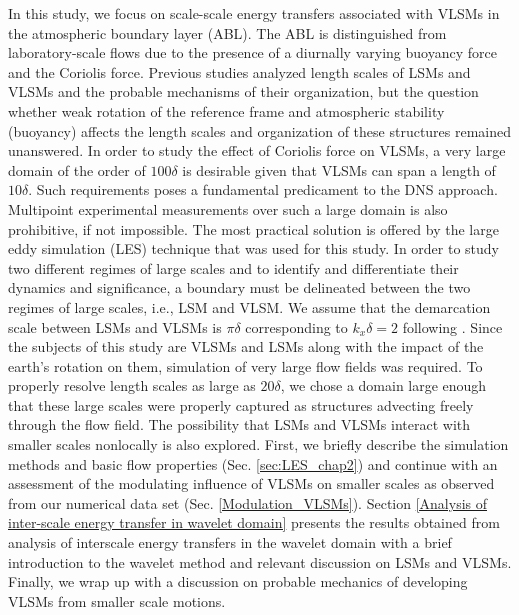 In this study, we focus on scale-scale energy transfers associated with VLSMs in the atmospheric boundary layer (ABL). The ABL is distinguished from laboratory-scale flows due to the presence of a diurnally varying buoyancy  force and the Coriolis force. Previous studies analyzed length scales of LSMs and VLSMs and the probable mechanisms of their organization, but the question whether weak rotation of the reference frame and atmospheric stability (buoyancy) affects the length scales and organization of these structures remained unanswered. In order to study the effect of Coriolis force on VLSMs, a very large domain of the order of $100\delta$ is desirable given that VLSMs can span a length of $10\delta$. Such requirements poses a fundamental predicament to the DNS approach. Multipoint experimental measurements over such a large domain is also prohibitive, if not impossible. The most practical solution is offered by the large eddy simulation (LES) technique that was used for this study. In order to study two different regimes of large scales and to identify and differentiate their dynamics and significance, a boundary must be delineated between the two regimes of large scales, i.e., LSM and VLSM. We assume that the demarcation scale between LSMs and VLSMs is $\pi\delta$ corresponding to $k_x\delta = 2$ following \citet{guala_adrian_jfm2006}. Since the subjects of this study are VLSMs and LSMs along with the impact of the earth's rotation on them, simulation of very large flow fields was required. To properly resolve length scales as large as $20\delta$,  we chose a domain large enough that these large scales were properly captured as structures advecting freely through the flow field. The possibility that LSMs and VLSMs  interact with smaller scales nonlocally is also explored.  First, we briefly describe the simulation methods and basic flow properties (Sec. \ref{sec:LES_chap2}) and continue with an assessment of the modulating influence of VLSMs on smaller scales as observed from our numerical data set (Sec. \ref{Modulation_VLSMs}).  Section \ref{Analysis of inter-scale energy transfer in wavelet domain} presents the results obtained from analysis of interscale energy transfers in the wavelet domain with a brief introduction to the wavelet method and relevant discussion on LSMs and VLSMs. Finally, we wrap up with a discussion on probable mechanics of developing VLSMs from smaller scale motions. 

